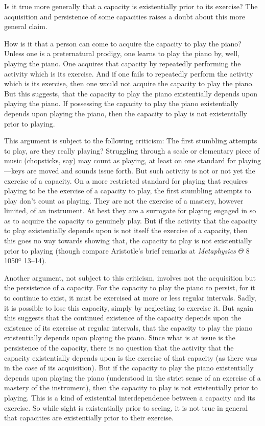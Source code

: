 \documentclass[12pt]{article}
\begin{document}
Is it true more generally that a capacity is existentially prior to its exercise? The acquisition and persistence of some capacities raises a doubt about this more general claim.

How is it that a person can come to acquire the capacity to play the piano? Unless one is a preternatural prodigy, one learns to play the piano by, well, playing the piano. One acquires that capacity by repeatedly performing the activity which is its exercise. And if one fails to repeatedly perform the activity which is its exercise, then one would not acquire the capacity to play the piano. But this suggests, that the capacity to play the piano existentially depends upon playing the piano. If possessing the capacity to play the piano existentially depends upon playing the piano, then the capacity to play is not existentially prior to playing. 

This argument is subject to the following criticism: The first stumbling attempts to play, are they really playing? Struggling through a scale or elementary piece of music (chopsticks, say) may count as playing, at least on one standard for playing---keys are moved and sounds issue forth. But such activity is not or not yet the exercise of a capacity. On a more restricted standard for playing that requires playing to be the exercise of a capacity to play, the first stumbling attempts to play don't count as playing. They are not the exercise of a mastery, however limited, of an instrument. At best they are a surrogate for playing engaged in so as to acquire the capacity to genuinely play. But if the activity that the capacity to play existentially depends upon is not itself the exercise of a capacity, then this goes no way towards showing that, the capacity to play is not existentially prior to playing (though compare Aristotle's brief remarks at \emph{Metaphysics} \( \Theta \) 8 1050\( ^{a} \) 13--14).

Another argument, not subject to this criticism, involves not the acquisition but the persistence of a capacity. For the capacity to play the piano to persist, for it to continue to exist, it must be exercised at more or less regular intervals. Sadly, it is possible to lose this capacity, simply by neglecting to exercise it. But again this suggests that the continued existence of the capacity depends upon the existence of its exercise at regular intervals, that the capacity to play the piano existentially depends upon playing the piano. Since what is at issue is the persistence of the capacity, there is no question that the activity that the capacity existentially depends upon is the exercise of that capacity (as there was in the case of its acquisition). But if the capacity to play the piano existentially depends upon playing the piano (understood in the strict sense of an exercise of a mastery of the instrument), then the capacity to play is not existentially prior to playing. This is a kind of existential interdependence between a capacity and its exercise. So while sight is existentially prior to seeing, it is not true in general that capacities are existentially prior to their exercise.
\end{document}
